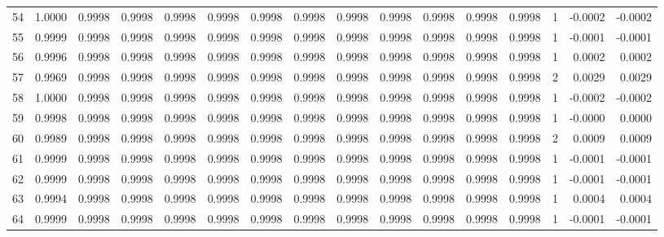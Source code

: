 \begin{tabular}{lrrrrrrrrrrrrrrr}
54  &      1.0000 &  0.9998 &  0.9998 &  0.9998 &  0.9998 &  0.9998 &  0.9998 &  0.9998 &  0.9998 &  0.9998 &   0.9998 &     0.9998 &      1 &                   -0.0002 &                    -0.0002 \\
55  &      0.9999 &  0.9998 &  0.9998 &  0.9998 &  0.9998 &  0.9998 &  0.9998 &  0.9998 &  0.9998 &  0.9998 &   0.9998 &     0.9998 &      1 &                   -0.0001 &                    -0.0001 \\
56  &      0.9996 &  0.9998 &  0.9998 &  0.9998 &  0.9998 &  0.9998 &  0.9998 &  0.9998 &  0.9998 &  0.9998 &   0.9998 &     0.9998 &      1 &                    0.0002 &                     0.0002 \\
57  &      0.9969 &  0.9998 &  0.9998 &  0.9998 &  0.9998 &  0.9998 &  0.9998 &  0.9998 &  0.9998 &  0.9998 &   0.9998 &     0.9998 &      2 &                    0.0029 &                     0.0029 \\
58  &      1.0000 &  0.9998 &  0.9998 &  0.9998 &  0.9998 &  0.9998 &  0.9998 &  0.9998 &  0.9998 &  0.9998 &   0.9998 &     0.9998 &      1 &                   -0.0002 &                    -0.0002 \\
59  &      0.9998 &  0.9998 &  0.9998 &  0.9998 &  0.9998 &  0.9998 &  0.9998 &  0.9998 &  0.9998 &  0.9998 &   0.9998 &     0.9998 &      1 &                   -0.0000 &                     0.0000 \\
60  &      0.9989 &  0.9998 &  0.9998 &  0.9998 &  0.9998 &  0.9998 &  0.9998 &  0.9998 &  0.9998 &  0.9998 &   0.9998 &     0.9998 &      2 &                    0.0009 &                     0.0009 \\
61  &      0.9999 &  0.9998 &  0.9998 &  0.9998 &  0.9998 &  0.9998 &  0.9998 &  0.9998 &  0.9998 &  0.9998 &   0.9998 &     0.9998 &      1 &                   -0.0001 &                    -0.0001 \\
62  &      0.9999 &  0.9998 &  0.9998 &  0.9998 &  0.9998 &  0.9998 &  0.9998 &  0.9998 &  0.9998 &  0.9998 &   0.9998 &     0.9998 &      1 &                   -0.0001 &                    -0.0001 \\
63  &      0.9994 &  0.9998 &  0.9998 &  0.9998 &  0.9998 &  0.9998 &  0.9998 &  0.9998 &  0.9998 &  0.9998 &   0.9998 &     0.9998 &      1 &                    0.0004 &                     0.0004 \\
64  &      0.9999 &  0.9998 &  0.9998 &  0.9998 &  0.9998 &  0.9998 &  0.9998 &  0.9998 &  0.9998 &  0.9998 &   0.9998 &     0.9998 &      1 &                   -0.0001 &                    -0.0001 \\

\end{tabular}

